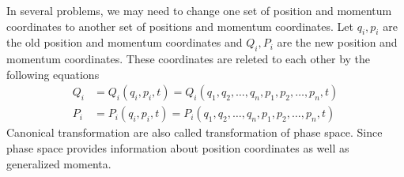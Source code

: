 \documentclass[12pt]{article}
\begin{document}
\begin{soln}
    In several problems, we may need to change one set of position and momentum coordinates to another set of positions and momentum coordinates. Let \(q_i, p_i\)  are the old position and momentum coordinates and \(Q_i,P_i\) are the new position and momentum coordinates. These coordinates are releted to each other by the following equations
    \begin{align*}
        Q_i&=Q_i(q_i,p_i,t)=Q_i(q_1,q_2,\dots,q_n,p_1,p_2,\dots,p_n,t)\\
        P_i&=P_i(q_i,p_i,t)=P_i(q_1,q_2,\dots,q_n,p_1,p_2,\dots,p_n,t)
    \end{align*}
    Canonical transformation are also called transformation of phase space. Since phase space provides information about position coordinates as well as generalized momenta.


\end{soln}
\end{document}
